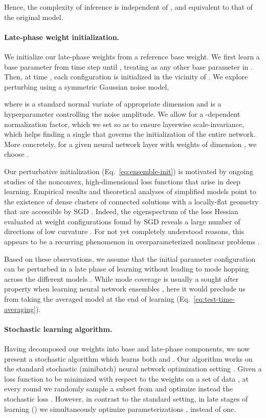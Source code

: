 \documentclass{article} \usepackage{iclr2021_conference,times}
\begin{document}
Hence, the complexity of inference is independent of , and equivalent to that of the original model.

\paragraph{Late-phase weight initialization.} We initialize our late-phase weights from a reference base weight. We first learn a base parameter  from time step  until , treating  as any other base parameter in . Then, at time , each configuration  is initialized in the vicinity of . We explore perturbing  using a symmetric Gaussian noise model,

where  is a standard normal variate of appropriate dimension and  is a hyperparameter controlling the noise amplitude. We allow for a -dependent normalization factor, which we set so as to ensure layerwise scale-invariance, which helps finding a single  that governs the initialization of the entire network. More concretely, for a given neural network layer  with weights  of dimension , we choose .

Our perturbative initialization (Eq.~\ref{eq:ensemble-init}) is motivated by ongoing studies of the nonconvex, high-dimensional loss functions that arise in deep learning. Empirical results and theoretical analyses of simplified models point to the existence of dense clusters of connected solutions with a locally-flat geometry \citep{hochreiter_flat_1997} that are accessible by SGD \citep{huang_snapshot_2017,garipov_loss_2018,baldassi_shaping_2020}. Indeed, the eigenspectrum of the loss Hessian evaluated at weight configurations found by SGD reveals a large number of directions of low curvature \citep{keskar_large-batch_2017,chaudhari_entropy-sgd_2019,sagun_empirical_2018}. For not yet completely understood reasons, this appears to be a recurring phenomenon in overparameterized nonlinear problems \citep[][]{brown_statistical_2003,waterfall_sloppy-model_2006}.

Based on these observations, we assume that the initial parameter configuration  can be perturbed in a late phase of learning without leading to mode hopping across the different models . While mode coverage is usually a sought after property when learning neural network ensembles \citep{fort_deep_2020}, here it would preclude us from taking the averaged model at the end of learning (Eq.~\ref{eq:test-time-averaging}).



\paragraph{Stochastic learning algorithm.} Having decomposed our weights into base and late-phase components, we now present a stochastic algorithm which learns both  and . Our algorithm works on the standard stochastic (minibatch) neural network optimization setting \citep{bottou_large-scale_2010}. Given a loss function  to be minimized with respect to the weights  on a set of data , at every round we randomly sample a subset  from  and optimize instead the stochastic loss . However, in contrast to the standard setting, in late stages of learning () we simultaneously optimize  parameterizations , instead of one.
\end{document}
